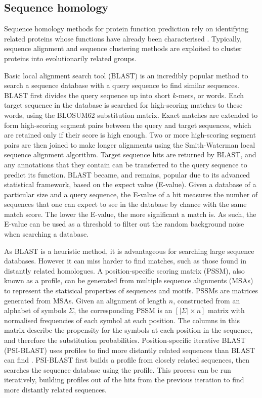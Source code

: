 \subsection{Sequence homology}

Sequence homology methods for protein function prediction rely on identifying related proteins whose functions have already been characterised \cite{Loewenstein2009,Lee2007,Bork1998,Watson2005}. Typically, sequence alignment and sequence clustering methods are exploited to cluster proteins into evolutionarily related groups.

Basic local alignment search tool (BLAST) \cite{Altschul1990} is an incredibly popular method to search a sequence database with a query sequence to find similar sequences. BLAST first divides the query sequence up into short $k$-mers, or words. Each target sequence in the database is searched for high-scoring matches to these words, using the BLOSUM62 substitution matrix. Exact matches are extended to form high-scoring segment pairs between the query and target sequences, which are retained only if their score is high enough. Two or more high-scoring segment pairs are then joined to make longer alignments using the Smith-Waterman local sequence alignment algorithm. Target sequence hits are returned by BLAST, and any annotations that they contain can be transferred to the query sequence to predict its function. BLAST became, and remains, popular due to its advanced statistical framework, based on the expect value (E-value). Given a database of a particular size and a query sequence, the E-value of a hit measures the number of sequences that one can expect to see in the database by chance with the same match score. The lower the E-value, the more significant a match is. As such, the E-value can be used as a threshold to filter out the random background noise when searching a database.

As BLAST is a heuristic method, it is advantageous for searching large sequence databases. However it can miss harder to find matches, such as those found in distantly related homologues. A position-specific scoring matrix (PSSM), also known as a profile, can be generated from multiple sequence alignments (MSAs) to represent the statisical properties of sequences and motifs.
PSSMs are matrices generated from MSAs. Given an alignment of length $n$, constructed from an alphabet of symbols $\Sigma$, the corresponding PSSM is an $[|\Sigma| \times n]$ matrix with normalised frequencies of each symbol at each position.
The columns in this matrix describe the propensity for the symbols at each position in the sequence, and therefore the substitution probabilities.
Position-specific iterative BLAST (PSI-BLAST) \cite{Altschul1997} uses profiles to find more distantly related sequences than BLAST can find \cite{Muller1999}.
PSI-BLAST first builds a profile from closely related sequences, then searches the sequence database using the profile.
This process can be run iteratively, building profiles out of the hits from the previous iteration to find more distantly related sequences.

